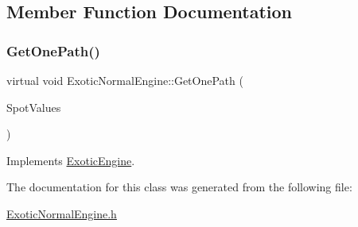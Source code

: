 \subsection{Member Function Documentation}
\hypertarget{classExoticNormalEngine_ab86b50858bc7159d23d18b8f692651d5}{}\label{classExoticNormalEngine_ab86b50858bc7159d23d18b8f692651d5} 
\subsubsection{\texorpdfstring{Get\+One\+Path()}{GetOnePath()}}
{\footnotesize\ttfamily virtual void Exotic\+Normal\+Engine\+::\+Get\+One\+Path (\begin{DoxyParamCaption}\item[{\hyperlink{classMJArray}{M\+J\+Array} \&}]{Spot\+Values }\end{DoxyParamCaption})\hspace{0.3cm}{\ttfamily [virtual]}}



Implements \hyperlink{classExoticEngine_a1be567d24e89abadb95bb2af7224b54e}{Exotic\+Engine}.



The documentation for this class was generated from the following file\+:\begin{DoxyCompactItemize}
\item 
\hyperlink{ExoticNormalEngine_8h}{Exotic\+Normal\+Engine.\+h}\end{DoxyCompactItemize}
